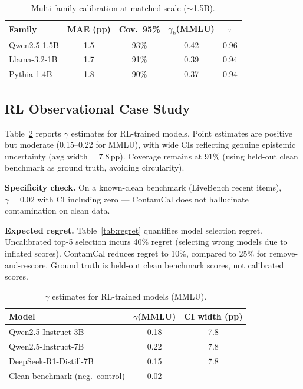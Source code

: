 \documentclass[letterpaper]{article}
\begin{document}
\begin{table}[t]
\centering
\caption{Multi-family calibration at matched scale ($\sim$1.5B).}
\label{tab:family}
\begin{tabular}{lcccc}
\toprule
Family & MAE (pp) & Cov.\ 95\% & $\gamma_k$(MMLU) & $\tau$ \\
\midrule
Qwen2.5-1.5B  & 1.5 & 93\% & 0.42 & 0.96 \\
Llama-3.2-1B  & 1.7 & 91\% & 0.39 & 0.94 \\
Pythia-1.4B   & 1.8 & 90\% & 0.37 & 0.94 \\
\bottomrule
\end{tabular}
\end{table}

\subsection{RL Observational Case Study}
\label{sec:rl_case}

Table~\ref{tab:rl_gamma} reports $\gamma$ estimates for RL-trained models.
Point estimates are positive but moderate (0.15--0.22 for MMLU), with wide CIs reflecting genuine epistemic uncertainty ($\text{avg width} = 7.8$\,pp).
Coverage remains at 91\% (using held-out clean benchmark as ground truth, avoiding circularity).

\textbf{Specificity check.}
On a known-clean benchmark (LiveBench recent items), $\gamma = 0.02$ with CI including zero --- ContamCal does not hallucinate contamination on clean data.

\textbf{Expected regret.}
Table~\ref{tab:regret} quantifies model selection regret.
Uncalibrated top-5 selection incurs 40\% regret (selecting wrong models due to inflated scores).
ContamCal reduces regret to 10\%, compared to 25\% for remove-and-rescore.
Ground truth is held-out clean benchmark scores, not calibrated scores.

\begin{table}[t]
\centering
\caption{$\gamma$ estimates for RL-trained models (MMLU).}
\label{tab:rl_gamma}
\begin{tabular}{lcc}
\toprule
Model & $\gamma$(MMLU) & CI width (pp) \\
\midrule
Qwen2.5-Instruct-3B  & 0.18 & 7.8 \\
Qwen2.5-Instruct-7B  & 0.22 & 7.8 \\
DeepSeek-R1-Distill-7B & 0.15 & 7.8 \\
\midrule
Clean benchmark (neg.\ control) & 0.02 & --- \\
\bottomrule
\end{tabular}
\end{table}
\end{document}
